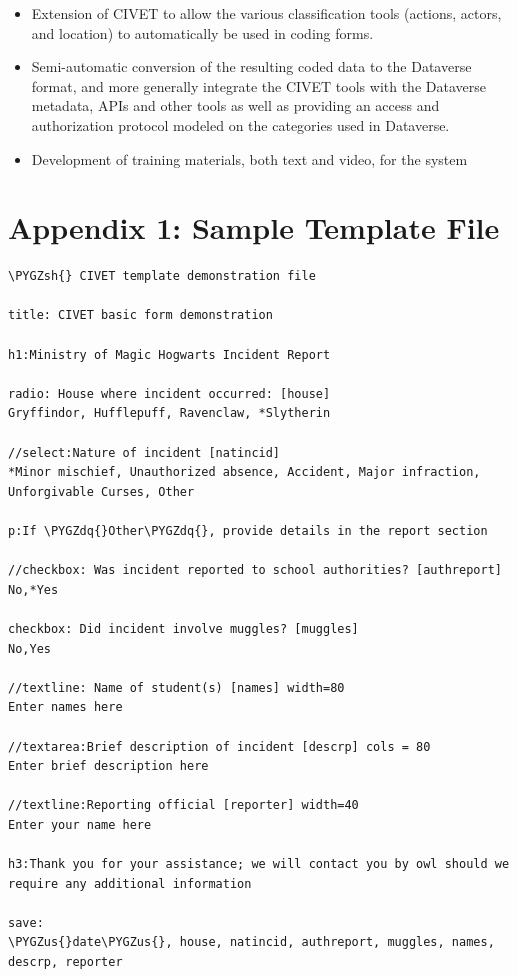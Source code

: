\documentclass[letterpaper,10pt,english]{sphinxmanual}
\def\PYGZus{\char`\_}
\def\PYGZsh{\char`\#}
\def\PYGZdq{\char`\"}
\begin{document}
\begin{itemize}
\item {} 
Extension of CIVET to allow the various classification tools
(actions, actors, and location) to automatically be used in coding
forms.

\item {} 
Semi-automatic conversion of the resulting coded data to the
Dataverse format, and more generally integrate the CIVET tools with
the Dataverse metadata, APIs and other tools as well as providing an
access and authorization protocol modeled on the categories used in
Dataverse.

\item {} 
Development of training materials, both text and video, for the
system

\end{itemize}


\chapter{Appendix 1: Sample Template File}
\label{appendix1:appendix-1-sample-template-file}\label{appendix1::doc}
\begin{Verbatim}[commandchars=\\\{\}]
\PYGZsh{} CIVET template demonstration file

title: CIVET basic form demonstration

h1:Ministry of Magic Hogwarts Incident Report

radio: House where incident occurred: [house]
Gryffindor, Hufflepuff, Ravenclaw, *Slytherin

//select:Nature of incident [natincid]
*Minor mischief, Unauthorized absence, Accident, Major infraction, Unforgivable Curses, Other

p:If \PYGZdq{}Other\PYGZdq{}, provide details in the report section

//checkbox: Was incident reported to school authorities? [authreport]
No,*Yes

checkbox: Did incident involve muggles? [muggles]
No,Yes

//textline: Name of student(s) [names] width=80
Enter names here

//textarea:Brief description of incident [descrp] cols = 80
Enter brief description here

//textline:Reporting official [reporter] width=40
Enter your name here

h3:Thank you for your assistance; we will contact you by owl should we require any additional information

save:
\PYGZus{}date\PYGZus{}, house, natincid, authreport, muggles, names, descrp, reporter
\end{Verbatim}
\end{document}
